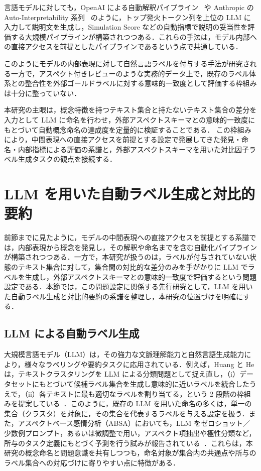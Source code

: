 言語モデルに対しても，OpenAI による自動解釈パイプライン~\cite{openai2023neurons} や Anthropic の Auto-Interpretability 系列~\cite{anthropic2024monosemantic} のように，トップ発火トークン列を上位の LLM に入力して説明文を生成し，Simulation Score などの自動指標で説明の妥当性を評価する大規模パイプラインが構築されつつある．これらの手法は，モデル内部への直接アクセスを前提としたパイプラインであるという点で共通している．

このようにモデルの内部表現に対して自然言語ラベルを付与する手法が研究される一方で，アスペクト付きレビューのような実務的データ上で，既存のラベル体系との整合性を外部ゴールドラベルに対する意味的一致度として評価する枠組みは十分に整っていない．

本研究の主眼は，概念特徴を持つテキスト集合と持たないテキスト集合の差分を入力として LLM に命名を行わせ，外部アスペクトスキーマとの意味的一致度にもとづいて自動概念命名の達成度を定量的に検証することである．
この枠組みにより，中間表現への直接アクセスを前提とする設定で発展してきた発見・命名・内部指標による評価の系譜と，外部アスペクトスキーマを用いた対比因子ラベル生成タスクの観点を接続する．

\section{LLM を用いた自動ラベル生成と対比的要約}

前節までに見たように，モデルの中間表現への直接アクセスを前提とする系譜では，内部表現から概念を発見し，その解釈や命名までを含む自動化パイプラインが構築されつつある．一方で，本研究が扱うのは，ラベルが付与されていない状態のテキスト集合に対して，集合間の対比的な差分のみを手がかりに LLM でラベルを生成し，外部アスペクトスキーマとの意味的一致度で評価するという問題設定である．本節では，この問題設定に関係する先行研究として，LLM を用いた自動ラベル生成と対比的要約の系譜を整理し，本研究の位置づけを明確にする．

\subsection{LLM による自動ラベル生成}

大規模言語モデル（LLM）は，その強力な文脈理解能力と自然言語生成能力により，様々なラベリングや要約タスクに応用されている．例えば，Huang と He は，テキストクラスタリングを LLM による分類問題として捉え直し，（i）データセットにもとづいて候補ラベル集合を生成し意味的に近いラベルを統合したうえで，（ii）各テキストに最も適切なラベルを割り当てる，という 2 段階の枠組みを提案している~\cite{huang2024textclustering}．このように，既存の LLM を用いた命名の多くは，単一の集合（クラスタ）を対象に，その集合を代表するラベルを与える設定を扱う．また，アスペクトベース感情分析（ABSA）においても，LLM をゼロショット／少数例プロンプト，あるいは微調整で用い，アスペクト項抽出や極性分類など，所与のタスク定義にもとづく予測を行う試みが報告されている~\cite{simmering2023llmabsa}．これらは，本研究の概念命名と問題意識を共有しつつも，命名対象が集合内の共通点や所与のラベル集合への対応づけに寄りやすい点に特徴がある．

